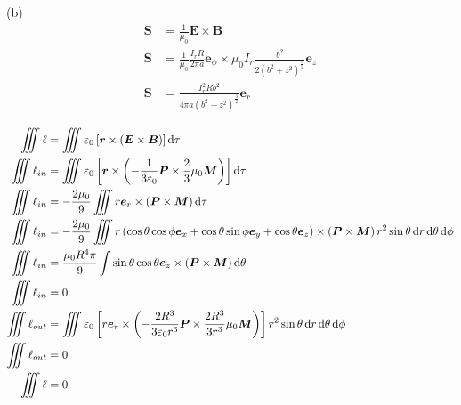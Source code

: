 (b)\begin{align*}
    \boldsymbol{S}&=\frac{1}{\mu_0}\boldsymbol{E}\times\boldsymbol{B}\\
    \boldsymbol{S}&=\frac{1}{\mu_0}\frac{I_rR}{2\pi a}\boldsymbol{e}_\phi\times\mu_0I_r\frac{b^2}{2(b^2+z^2)^\frac32}\boldsymbol{e}_z\\
    \boldsymbol{S}&=\frac{I_r^2Rb^2}{4\pi a(b^2+z^2)^\frac32}\boldsymbol{e}_r
\end{align*}

\begin{align*}
    \iiint\ell&=\iiint\varepsilon_0\left[\boldsymbol{r}\times(\boldsymbol E\times\boldsymbol B)\right]\dif\tau\\
    \iiint\ell_{in}&=\iiint\varepsilon_0\left[\boldsymbol{r}\times\left(-\frac{1}{3\varepsilon_0}\boldsymbol{P}\times\frac23\mu_0\boldsymbol M\right)\right]\dif\tau\\
    \iiint\ell_{in}&=-\frac{2\mu_0}{9}\iiint r\boldsymbol{e}_r\times\left(\boldsymbol{P}\times\boldsymbol M\right)\dif\tau\\
    \iiint\ell_{in}&=-\frac{2\mu_0}{9}\iiint r\left(    \cos\theta\cos\phi\boldsymbol{e}_x+\cos\theta\sin\phi\boldsymbol{e}_y+\cos\theta\boldsymbol{e}_z\right)\times\left(\boldsymbol{P}\times\boldsymbol M\right)r^2\sin\theta\dif r\dif\theta\dif\phi\\
    \iiint\ell_{in}&=\frac{\mu_0R^4\pi}{9}\int \sin\theta\cos\theta\boldsymbol{e}_z\times\left(\boldsymbol{P}\times\boldsymbol M\right)\dif\theta\\
    \iiint\ell_{in}&=0\\
    \iiint\ell_{out}&=\iiint\varepsilon_0\left[r\boldsymbol{e}_r\times\left(-\frac{2R^3}{3\varepsilon_0r^3}\boldsymbol{P}\times\frac{2R^3}{3r^3}\mu_0\boldsymbol M\right)\right]r^2\sin\theta\dif r\dif\theta\dif\phi\\
    \iiint\ell_{out}&=0\\
    \iiint\ell&=0
\end{align*}
